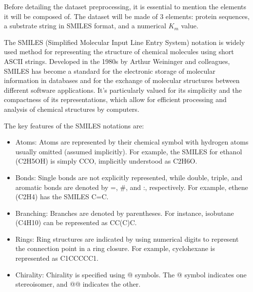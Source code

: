Before detailing the dataset preprocessing, it is essential to mention the elements it will be composed of.
The dataset will be made of 3 elements: protein sequences, a substrate string in SMILES format, and a
numerical $K_m$ value.

The SMILES (Simplified Molecular Input Line Entry System) notation is widely used method for 
representing the structure of chemical molecules using short ASCII strings. \cite{smiles}
Developed in the 1980s by Arthur Weininger and colleagues, SMILES has become a standard for the 
electronic storage of molecular information in databases and for the exchange of molecular structures 
between different software applications. It's particularly valued for its simplicity and the 
compactness of its representations, which allow for efficient processing and analysis of chemical 
structures by computers.

The key features of the SMILES notations are:
\begin{itemize}
  \item Atoms: Atoms are represented by their chemical symbol with hydrogen atoms usually 
  omitted (assumed implicitly). For example, the SMILES for ethanol (C2H5OH) is simply CCO, 
  implicitly understood as C2H6O.
  \item Bonds: Single bonds are not explicitly represented, while double, triple, 
  and aromatic bonds are denoted by =, \#, and :, respectively. For example, ethene (C2H4) 
  has the SMILES C=C.
  \item Branching: Branches are denoted by parentheses. For instance, isobutane (C4H10) can be 
  represented as CC(C)C.
  \item Rings: Ring structures are indicated by using numerical digits to represent the 
  connection point in a ring closure. For example, cyclohexane is represented as C1CCCCC1.
  \item Chirality: Chirality is specified using @ symbols. The @ symbol indicates one stereoisomer, 
  and @@ indicates the other.
\end{itemize}

